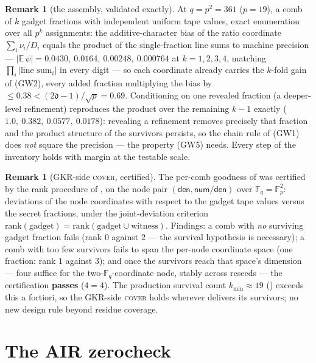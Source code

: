 \documentclass{article}
\newcommand{\Fp}{\mathbb{F}_p}
\newcommand{\Fq}{\mathbb{F}_q}
\newcommand{\extdeg}{\mathfrak{d}}
\newcommand{\num}{\mathsf{num}}
\newcommand{\den}{\mathsf{den}}
\theoremstyle{definition}
\newtheorem{remark}[theorem]{Remark}
\begin{document}
\begin{remark}[the assembly, validated exactly]\label{rem:numM}
At $q = p^2 = 361$ ($p = 19$), a comb of $k$ gadget fractions with independent uniform tape values, exact enumeration over all $p^k$ assignments: the additive-character bias of the ratio coordinate $\sum_i \nu_i / D_i$ equals the product of the single-fraction line sums to machine precision --- $|\mathbb{E}\,\psi| = 0.0430,\ 0.0164,\ 0.00248,\ 0.000764$ at $k = 1, 2, 3, 4$, matching $\prod_i |\text{line sum}_i|$ in every digit --- so each coordinate already carries the $k$-fold gain of (GW2), every added fraction multiplying the bias by $\leq 0.38 < (2\extdeg-1)/\sqrt p = 0.69$. Conditioning on one revealed fraction (a deeper-level refinement) reproduces the product over the remaining $k-1$ exactly ($1.0,\ 0.382,\ 0.0577,\ 0.0178$): revealing a refinement removes precisely that fraction and the product structure of the survivors persists, so the chain rule of (GW1) does \emph{not} square the precision --- the property (GW5) needs. Every step of the inventory holds with margin at the testable scale.
\end{remark}

\begin{remark}[GKR-side \textsc{cover}, certified]\label{rem:numO}
The per-comb goodness of  was certified by the rank procedure of , on the node pair $(\den, \num/\den)$ over $\Fq = \Fp^2$: deviations of the node coordinates with respect to the gadget tape values versus the secret fractions, under the joint-deviation criterion $\mathrm{rank}(\text{gadget}) = \mathrm{rank}(\text{gadget} \cup \text{witness})$. Findings: a comb with \emph{no} surviving gadget fraction fails (rank $0$ against $2$ --- the  survival hypothesis is necessary); a comb with too few survivors fails to span the per-node coordinate space (one fraction: rank $1$ against $3$); and once the survivors reach that space's dimension --- four suffice for the two-$\Fq$-coordinate node, stably across reseeds --- the certification \textbf{passes} ($4 = 4$). The production survival count $k_{\min} \approx 19$ () exceeds this a fortiori, so the GKR-side \textsc{cover} holds wherever  delivers its survivors; no new design rule beyond residue coverage.
\end{remark}

\section{The AIR zerocheck}\label{sec:air}
\end{document}
